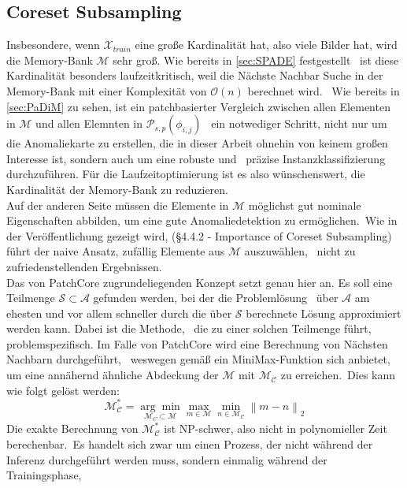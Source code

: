 \subsection{Coreset Subsampling}\label{subsec:CoresetSubsampling}
Insbesondere, wenn $\mathcal{X}_{train}$ eine große Kardinalität hat, also viele Bilder hat, wird die Memory-Bank $\mathcal{M}$ sehr groß. Wie bereits in \ref{sec:SPADE} festgestellt \
ist diese Kardinalität besonders laufzeitkritisch, weil die Nächste Nachbar Suche in der Memory-Bank mit einer Komplexität von $\mathcal{O}(n)$ berechnet wird. \ 
Wie bereits in \ref{sec:PaDiM} zu sehen, ist ein \glqq patchbasierter\grqq{} Vergleich zwischen allen Elementen in $\mathcal{M}$ und allen Elemnten in $\mathcal{P}_{s,p}\left(\phi_{i,j}\right)$ \
ein notwediger Schritt, nicht nur um die Anomaliekarte zu erstellen, die in dieser Arbeit ohnehin von keinem großen Interesse ist, sondern auch um eine robuste und \ 
präzise Instanzklassifizierung durchzuführen. Für die Laufzeitoptimierung ist es also wünschenswert, die Kardinalität der Memory-Bank zu reduzieren.\\
Auf der anderen Seite müssen die Elemente in $\mathcal{M}$ möglichst gut nominale Eigenschaften abbilden, um eine gute Anomaliedetektion zu ermöglichen.\
Wie in der Veröffentlichung gezeigt wird, (§4.4.2 - Importance of Coreset Subsampling) führt der naive Ansatz, zufällig Elemente aus $\mathcal{M}$ auszuwählen, \
nicht zu zufriedenstellenden Ergebnissen.\\
Das von PatchCore zugrundeliegenden Konzept setzt genau hier an. Es soll eine Teilmenge $\mathcal{S}\subset \mathcal{A}$ gefunden werden, bei der die Problemlösung \
über $\mathcal{A}$ am ehesten und vor allem schneller durch die über $\mathcal{S}$ berechnete Lösung approximiert werden kann. Dabei ist die Methode, \
die zu einer solchen Teilmenge führt, problemspezifisch. Im Falle von PatchCore wird eine Berechnung von Nächsten Nachbarn durchgeführt, \
weswegen gemäß \cite{sener2018active} ein \glqq MiniMax-Funktion\grqq{} sich anbietet, um eine annähernd ähnliche Abdeckung der $\mathcal{M}$ mit $\mathcal{M_{C}}$ zu erreichen.\
Dies kann wie folgt gelöst werden:\
$$
\mathcal{M_{C}^{*}} = \underset{\mathcal{M}_{C}\subset\mathcal{M}}{\arg\min}\underset{m\in\mathcal{M}}{\max}\underset{n\in\mathcal{M_{C}}}{\min}\left\|m-n\right\|_{2}
$$
Die exakte Berechnung von $\mathcal{M_{C}^{*}}$ ist NP-schwer, also nicht in polynomieller Zeit berechenbar.\
Es handelt sich zwar um einen Prozess, der nicht während der Inferenz durchgeführt werden muss, sondern einmalig während der Trainingsphase, \
